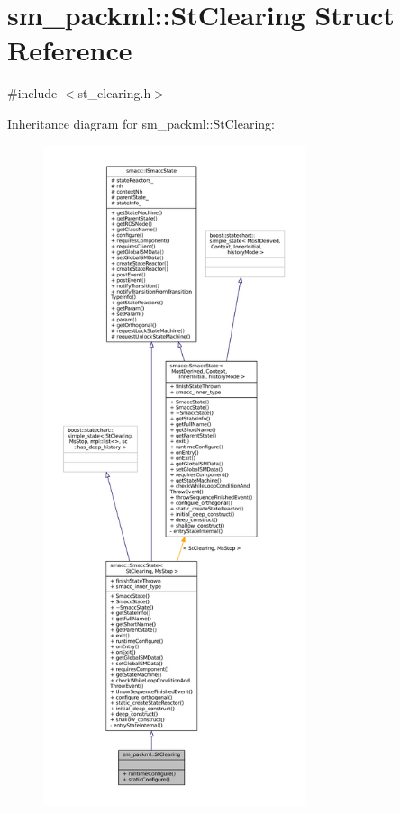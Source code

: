 \hypertarget{structsm__packml_1_1StClearing}{}\section{sm\+\_\+packml\+:\+:St\+Clearing Struct Reference}
\label{structsm__packml_1_1StClearing}


{\ttfamily \#include $<$st\+\_\+clearing.\+h$>$}



Inheritance diagram for sm\+\_\+packml\+:\+:St\+Clearing\+:
\nopagebreak
\begin{figure}[H]
\begin{center}
\leavevmode
\includegraphics[height=550pt]{structsm__packml_1_1StClearing__inherit__graph}
\end{center}
\end{figure}


